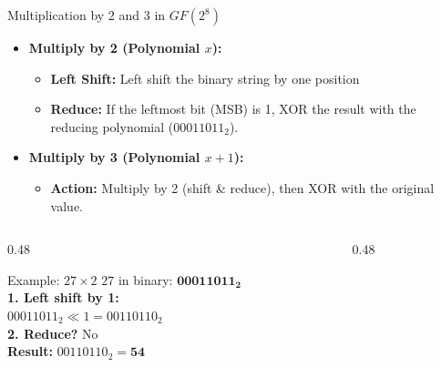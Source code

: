 \documentclass{cubeamer}
\begin{document}
\begin{frame}{Multiplication by 2 and 3 in $GF(2^8)$}
    \begin{itemize}
        \item \textbf{Multiply by 2 (Polynomial $x$):}
        \begin{itemize}
            \item \textbf{Left Shift:} Left shift the binary string by one position
            \item \textbf{Reduce:} If the leftmost bit (MSB) is 1, XOR the result with the reducing polynomial ($00011011_2$).
        \end{itemize}
        \item \textbf{Multiply by 3 (Polynomial $x+1$):}
        \begin{itemize}
            \item \textbf{Action:} Multiply by 2 (shift \& reduce), then XOR with the original value.
        \end{itemize}
    \end{itemize}
    \pause
    \begin{columns}[T]
        \begin{column}{0.48\textwidth}
            \begin{block}{Example: $27 \times 2$}
                $27$ in binary: $\mathbf{00011011_2}$ \\
                \vspace{0.5em}
                \textbf{1. Left shift by 1:}\\
                $00011011_2 \ll 1 = 00110110_2$ \\
                \textbf{2. Reduce?} No \\
                \textbf{Result:} $00110110_2 = \mathbf{54}$
            \end{block}
        \end{column}

        \begin{column}{0.48\textwidth}
        \end{column}
    \end{columns}
\end{frame}
\end{document}
